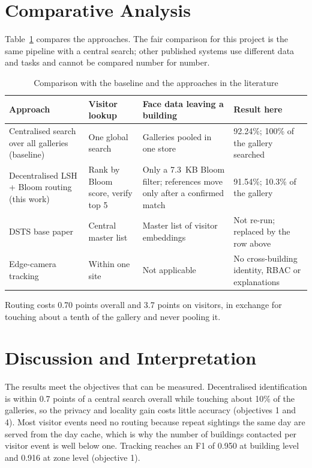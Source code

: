 \documentclass[12pt,a4paper,oneside]{report}
\begin{document}
\section{Comparative Analysis}
Table~\ref{tab:comparison} compares the approaches. The fair comparison for this project is the same pipeline with a central search; other published systems \cite{ref1,ref2,ref3,ref4,ref5} use different data and tasks and cannot be compared number for number.

\begin{table}[htbp]
\centering
\caption{Comparison with the baseline and the approaches in the literature}\label{tab:comparison}
{\small\setlength{\tabcolsep}{4pt}\renewcommand{\arraystretch}{1.2}
\begin{tabular}{|p{3.83cm}|p{3.06cm}|p{4.02cm}|p{3.06cm}|}\hline
\textbf{Approach} & \textbf{Visitor lookup} & \textbf{Face data leaving a building} & \textbf{Result here}\\\hline
Centralised search over all galleries (baseline) & One global search & Galleries pooled in one store & 92.24\%; 100\% of the gallery searched\\\hline
Decentralised LSH + Bloom routing (this work) & Rank by Bloom score, verify top 5 & Only a 7.3~KB Bloom filter; references move only after a confirmed match & 91.54\%; 10.3\% of the gallery\\\hline
DSTS base paper \cite{ref6} & Central master list & Master list of visitor embeddings & Not re-run; replaced by the row above\\\hline
Edge-camera tracking \cite{ref1,ref2,ref3,ref4,ref5} & Within one site & Not applicable & No cross-building identity, RBAC or explanations\\\hline
\end{tabular}}
\end{table}

Routing costs 0.70 points overall and 3.7 points on visitors, in exchange for touching about a tenth of the gallery and never pooling it.


\section{Discussion and Interpretation}
The results meet the objectives that can be measured. Decentralised identification is within 0.7 points of a central search overall while touching about 10\% of the galleries, so the privacy and locality gain costs little accuracy (objectives 1 and 4). Most visitor events need no routing because repeat sightings the same day are served from the day cache, which is why the number of buildings contacted per visitor event is well below one. Tracking reaches an F1 of 0.950 at building level and 0.916 at zone level (objective 1).
\end{document}
